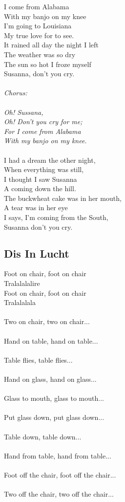 \documentclass[a5paper]{article}
\begin{document}
I come from Alabama\\
With my banjo on my knee\\
I’m going to Louisiana\\
My true love for to see.\\
It rained all day the night I left\\
The weather was so dry\\
The sun so hot I froze myself\\
Susanna, don't you cry.\\
\\
\textit{Chorus:\\
\\
Oh! Sussana,\\
Oh! Don’t you cry for me;\\
For I come from Alabama\\
With my banjo on my knee.\\}
\\
I had a dream the other night,\\
When everything was still,\\
I thought I saw Susanna\\
A coming down the hill.\\
The buckwheat cake was in her mouth,\\
A tear was in her eye\\
I says, I'm coming from the South,\\
Susanna don't you cry.\\

\newpage

\subsection{Dis In Lucht} %
\label{sub:dis_in_lucht}


Foot on chair, foot on chair \\
Tralalalalire\\
Foot on chair, foot on chair \\
Tralalalala\\
\\
Two on chair, two on chair...\\
\\
Hand on table, hand on table... \\
\\
Table flies, table flies...\\
\\
Hand on glass, hand on glass...\\
\\
Glass to mouth, glass to mouth...\\
\\
Put glass down, put glass down...\\
\\
Table down, table down...\\
\\
Hand from table, hand from table...\\
\\
Foot off the chair, foot off the chair...\\
\\
Two off the chair, two off the chair...
\end{document}
